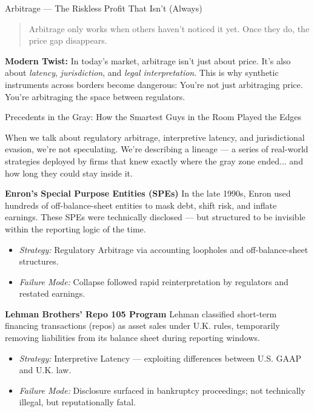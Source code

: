 \begin{TechnicalSidebar}{Arbitrage --- The Riskless Profit That Isn’t (Always)}
    \begin{quote}
      Arbitrage only works when others haven't noticed it yet. Once they do, the price gap disappears.
    \end{quote}
    
    \textbf{Modern Twist:}  
    In today’s market, arbitrage isn't just about price. It's also about \textit{latency}, 
    \textit{jurisdiction}, and \textit{legal interpretation}.  
    This is why synthetic instruments across borders become dangerous:  
    You're not just arbitraging price.  
    You're arbitraging the space between regulators.
    
\end{TechnicalSidebar}

\medskip

\begin{HistoricalSidebar}{Precedents in the Gray: How the Smartest Guys in the Room Played the Edges}

  When we talk about regulatory arbitrage, interpretive latency, and jurisdictional evasion,  
  we’re not speculating.  
  We’re describing a lineage — a series of real-world strategies deployed by firms that knew exactly 
  where the gray zone ended... and how long they could stay inside it.
  
  \medskip
  
  \textbf{Enron’s Special Purpose Entities (SPEs)}  
  In the late 1990s, Enron used hundreds of off-balance-sheet entities to mask debt, shift risk, and inflate earnings.  
  These SPEs were technically disclosed — but structured to be invisible within the reporting logic of the time.
  
  \begin{itemize}
    \item \textit{Strategy:} Regulatory Arbitrage via accounting loopholes and off-balance-sheet structures.
    \item \textit{Failure Mode:} Collapse followed rapid reinterpretation by regulators and restated earnings.
  \end{itemize}
  
  \medskip
  
  \textbf{Lehman Brothers’ Repo 105 Program}  
  Lehman classified short-term financing transactions (repos) as asset sales under U.K. rules,  
  temporarily removing liabilities from its balance sheet during reporting windows.
  
  \begin{itemize}
    \item \textit{Strategy:} Interpretive Latency — exploiting differences between U.S. GAAP and U.K. law.
    \item \textit{Failure Mode:} Disclosure surfaced in bankruptcy proceedings; not technically illegal, but reputationally fatal.
  \end{itemize}
  

\end{HistoricalSidebar}
